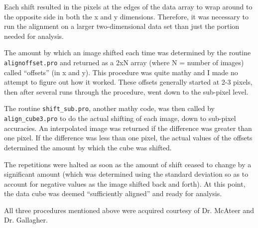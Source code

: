 \documentclass[preprint]{aastex}   %
\begin{document}
Each shift resulted in the pixels at the edges of the data array to wrap around
to the opposite side in both the x and y dimensions. Therefore, it was necessary
to run the alignment on a larger two-dimensional data set than just the portion
needed for analysis.

The amount by which an image shifted each time was determined by the routine
\verb|alignoffset.pro| and returned as a 2xN array (where N = number of images)
called ``offsets'' (in x and y).
This procedure was quite mathy and I made no attempt to figure out how it worked.
These offsets generally started at 2-3 pixels, then after several
runs through the procedure, went down to the sub-pixel level.

The routine \verb|shift_sub.pro|, another mathy code, was then called by
\verb|align_cube3.pro| to do the actual shifting of each image, down to
sub-pixel accuracies. An interpolated image was returned if the difference
was greater than one pixel. If the difference was less than one pixel,
the actual values of the offsets determined the amount by which the cube
was shifted.

The repetitions
were halted as soon as the amount of shift ceased to change by a significant
amount (which was determined using the standard deviation so as to account for
negative values as the image shifted back and forth). At this point, the data
cube was deemed ``sufficiently aligned'' and ready for analysis.

All three procedures mentioned above were acquired courtesy of Dr. McAteer
and Dr. Gallagher.
\end{document}
